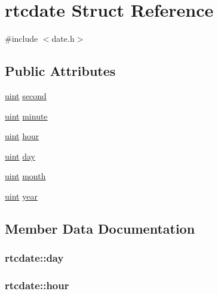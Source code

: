 \hypertarget{structrtcdate}{}\section{rtcdate Struct Reference}
\label{structrtcdate}


{\ttfamily \#include $<$date.\+h$>$}

\subsection*{Public Attributes}
\begin{DoxyCompactItemize}
\item 
\hyperlink{types_8h_a91ad9478d81a7aaf2593e8d9c3d06a14}{uint} \hyperlink{structrtcdate_affc39128483c500d77d1a012fe045664}{second}
\item 
\hyperlink{types_8h_a91ad9478d81a7aaf2593e8d9c3d06a14}{uint} \hyperlink{structrtcdate_a5984e264f332d7634912db2716472aa7}{minute}
\item 
\hyperlink{types_8h_a91ad9478d81a7aaf2593e8d9c3d06a14}{uint} \hyperlink{structrtcdate_ac601418b8ff95c35e8fddb47dd3fc77b}{hour}
\item 
\hyperlink{types_8h_a91ad9478d81a7aaf2593e8d9c3d06a14}{uint} \hyperlink{structrtcdate_a476a4a04d68d88b1515123aa24af8a4d}{day}
\item 
\hyperlink{types_8h_a91ad9478d81a7aaf2593e8d9c3d06a14}{uint} \hyperlink{structrtcdate_a3c509170b31d76f828681c2df54bf0b1}{month}
\item 
\hyperlink{types_8h_a91ad9478d81a7aaf2593e8d9c3d06a14}{uint} \hyperlink{structrtcdate_a143aaaa0a5fcaae876c0af5f135ea5c8}{year}
\end{DoxyCompactItemize}


\subsection{Member Data Documentation}
\subsubsection[{\texorpdfstring{day}{day}}]{ rtcdate\+::day}\hypertarget{structrtcdate_a476a4a04d68d88b1515123aa24af8a4d}{}\label{structrtcdate_a476a4a04d68d88b1515123aa24af8a4d}
\subsubsection[{\texorpdfstring{hour}{hour}}]{ rtcdate\+::hour}\hypertarget{structrtcdate_ac601418b8ff95c35e8fddb47dd3fc77b}{}\label{structrtcdate_ac601418b8ff95c35e8fddb47dd3fc77b}
